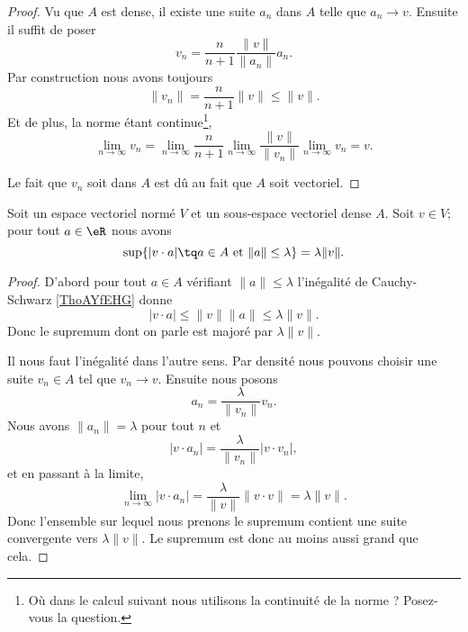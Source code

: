 \begin{proof}
    Vu que \( A\) est dense, il existe une suite \( a_n\) dans \( A\) telle que \( a_n\to v\). Ensuite il suffit de poser
    \begin{equation}
        v_n=\frac{ n }{ n+1 }\frac{ \| v \| }{ \| a_n \| }a_n.
    \end{equation}
    Par construction nous avons toujours
    \begin{equation}
        \| v_n \|=\frac{ n }{ n+1 }\| v \|\leq \| v \|.
    \end{equation}
    Et de plus, la norme étant continue\footnote{Où dans le calcul suivant nous utilisons la continuité de la norme ? Posez-vous la question.},
    \begin{equation}
        \lim_{n\to \infty} v_n=\lim_{n\to \infty} \frac{ n }{ n+1 }\lim_{n\to \infty} \frac{ \| v \| }{ \| v_n \| }\lim_{n\to \infty} v_n=v.
    \end{equation}

    Le fait que \( v_n\) soit dans \( A\) est dû au fait que \( A\) soit vectoriel.
\end{proof}

\begin{proposition}     \label{PROPooVEMGooYKhMFy}
    Soit un espace vectoriel normé \( V\) et un sous-espace vectoriel dense \( A\). Soit \( v\in V\); pour tout \( a\in \eR\) nous avons
    \begin{equation}
        \sup\{ | v\cdot a |\tq a\in A\text{ et }\| a \|\leq \lambda \}=\lambda\| v \|.
    \end{equation}
\end{proposition}

\begin{proof}
    D'abord pour tout \( a\in A\) vérifiant \( \| a \|\leq \lambda\) l'inégalité de Cauchy-Schwarz \ref{ThoAYfEHG} donne
    \begin{equation}
        | v\cdot a |\leq \| v \|\| a \|\leq \lambda\| v \|.
    \end{equation}
    Donc le supremum dont on parle est majoré par \( \lambda\| v \|\).

    Il nous faut l'inégalité dans l'autre sens. Par densité nous pouvons choisir une suite \( v_n\in A\) tel que \( v_n\to v\). Ensuite nous posons
    \begin{equation}
        a_n=\frac{ \lambda }{ \| v_n \| }v_n.
    \end{equation}
    Nous avons \( \| a_n \|=\lambda\) pour tout \( n\) et
    \begin{equation}
        | v\cdot a_n |=\frac{ \lambda }{ \| v_n \| }| v\cdot v_n |,
    \end{equation}
    et en passant à la limite,
    \begin{equation}
        \lim_{n\to \infty} | v\cdot a_n |=\frac{ \lambda }{ \| v \| }\| v\cdot v \|=\lambda\| v \|.
    \end{equation}
    Donc l'ensemble sur lequel nous prenons le supremum contient une suite convergente vers \( \lambda\| v \|\). Le supremum est donc au moins aussi grand que cela.
\end{proof}

